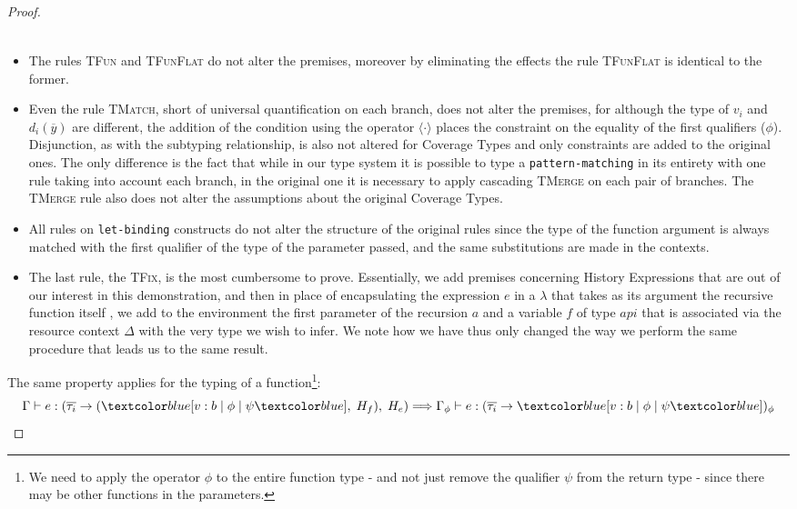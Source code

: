\begin{proof}
\begin{itemize}
\begin{equation}
\begin{gathered}
            \end{gathered}
        \end{equation}
        \item The rules \textsc{TFun} and \textsc{TFunFlat} do not alter the premises, moreover by eliminating the effects the rule \textsc{TFunFlat} is identical to the former.
        \item Even the rule \textsc{TMatch}, short of universal quantification on each branch, does not alter the premises, for although the type of $v_i$ and $d_i(\overline{y})$ are different, the addition of the condition using the operator $\langle \cdot \rangle$ places the constraint on the equality of the first qualifiers ($\phi$). Disjunction, as with the subtyping relationship, is also not altered for Coverage Types and only constraints are added to the original ones. The only difference is the fact that while in our type system it is possible to type a \verb|pattern-matching| in its entirety with one rule taking into account each branch, in the original one it is necessary to apply cascading \textsc{TMerge} on each pair of branches.
        The \textsc{TMerge} rule also does not alter the assumptions about the original Coverage Types.
        \item All rules on \verb|let-binding| constructs do not alter the structure of the original rules since the type of the function argument is always matched with the first qualifier of the type of the parameter passed, and the same substitutions are made in the contexts.
        \item The last rule, the \textsc{TFix}, is the most cumbersome to prove. Essentially, we add premises concerning History Expressions that are out of our interest in this demonstration, and then in place of encapsulating the expression $e$ in a $\lambda$ that takes as its argument the recursive function itself \cite{coverage}, we add to the environment the first parameter of the recursion $a$ and a variable $f$ of type $api$ that is associated via the resource context $\Delta$ with the very type we wish to infer. We note how we have thus only changed the way we perform the same procedure that leads us to the same result.
    \end{itemize}

    The same property applies for the typing of a function\footnote{We need to apply the operator $\phi$ to the entire function type - and not just remove the qualifier $\psi$ from the return type - since there may be other functions in the parameters.}:
    \begin{equation}
        \Gamma \vdash e : (\overline{\tau_i} \rightarrow (\under{v: b \;|\; \phi \;|\; \psi}, \;H_f), \;H_e) \Longrightarrow \Gamma_{\phi} \vdash e : (\overline{\tau_i} \rightarrow \under{v: b \;|\; \phi \;|\; \psi})_{\phi}
    \end{equation}
\end{proof}

